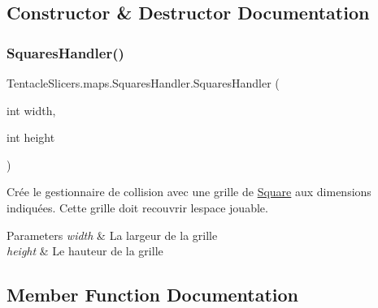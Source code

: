 \subsection{Constructor \& Destructor Documentation}
\mbox{\label{class_tentacle_slicers_1_1maps_1_1_squares_handler_a359564e42a93abcbfab17e27a96923c0}} 
\subsubsection{\texorpdfstring{Squares\+Handler()}{SquaresHandler()}}
{\footnotesize\ttfamily Tentacle\+Slicers.\+maps.\+Squares\+Handler.\+Squares\+Handler (\begin{DoxyParamCaption}\item[{int}]{width,  }\item[{int}]{height }\end{DoxyParamCaption})}



Crée le gestionnaire de collision avec une grille de \hyperlink{class_tentacle_slicers_1_1maps_1_1_square}{Square} aux dimensions indiquées. Cette grille doit recouvrir l\textquotesingle{}espace jouable. 


\begin{DoxyParams}{Parameters}
{\em width} & La largeur de la grille \\
\hline
{\em height} & Le hauteur de la grille \\
\hline
\end{DoxyParams}


\subsection{Member Function Documentation}
\mbox{\label{class_tentacle_slicers_1_1maps_1_1_squares_handler_a2a62ea5ef7ec0cc77fc29954593b1e26}} 
